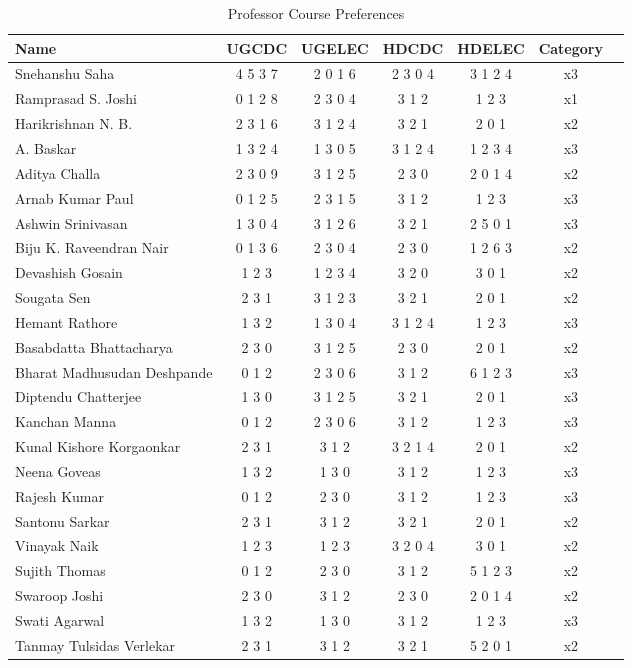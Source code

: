 \documentclass{article}
\begin{document}
\begin{table}[h]
  \centering
  \caption{Professor Course Preferences}
  \begin{tabular}{lcccccc}
    \toprule
    Name & UGCDC & UGELEC & HDCDC & HDELEC & Category \\
    \midrule
       Snehanshu Saha & 4 5 3 7 & 2 0 1 6 & 2 3 0 4 & 3 1 2 4 & x3 \\
Ramprasad S. Joshi & 0 1 2 8 & 2 3 0 4 & 3 1 2 & 1 2 3 & x1 \\
Harikrishnan N. B. & 2 3 1 6 & 3 1 2 4 & 3 2 1 & 2 0 1 & x2 \\
A. Baskar & 1 3 2 4 & 1 3 0 5 & 3 1 2 4 & 1 2 3 4 & x3 \\
Aditya Challa & 2 3 0 9 & 3 1 2 5 & 2 3 0 & 2 0 1 4 & x2 \\
Arnab Kumar Paul & 0 1 2 5 & 2 3 1 5 & 3 1 2 & 1 2 3 & x3 \\
Ashwin Srinivasan & 1 3 0 4 & 3 1 2 6 & 3 2 1 & 2 5 0 1 & x3 \\
Biju K. Raveendran Nair & 0 1 3 6 & 2 3 0 4 & 2 3 0 & 1 2 6 3 & x2 \\
Devashish Gosain & 1 2 3 & 1 2 3 4 & 3 2 0 & 3 0 1 & x2 \\
Sougata Sen & 2 3 1 & 3 1 2 3 & 3 2 1 & 2 0 1 & x2 \\
Hemant Rathore & 1 3 2 & 1 3 0 4 & 3 1 2 4 & 1 2 3 & x3 \\
Basabdatta Bhattacharya & 2 3 0 & 3 1 2 5 & 2 3 0 & 2 0 1 & x2 \\
Bharat Madhusudan Deshpande & 0 1 2 & 2 3 0 6 & 3 1 2 & 6 1 2 3 & x3 \\
Diptendu Chatterjee & 1 3 0 & 3 1 2 5 & 3 2 1 & 2 0 1 & x3 \\
Kanchan Manna & 0 1 2 & 2 3 0 6 & 3 1 2 & 1 2 3 & x3 \\
Kunal Kishore Korgaonkar & 2 3 1 & 3 1 2 & 3 2 1 4 & 2 0 1 & x2 \\
Neena Goveas & 1 3 2 & 1 3 0 & 3 1 2 & 1 2 3 & x3 \\
Rajesh Kumar & 0 1 2 & 2 3 0 & 3 1 2 & 1 2 3 & x3 \\
Santonu Sarkar & 2 3 1 & 3 1 2 & 3 2 1 & 2 0 1 & x2 \\
Vinayak Naik & 1 2 3 & 1 2 3 & 3 2 0 4 & 3 0 1 & x2 \\
Sujith Thomas & 0 1 2 & 2 3 0 & 3 1 2 & 5 1 2 3 & x2 \\
Swaroop Joshi & 2 3 0 & 3 1 2 & 2 3 0 & 2 0 1 4 & x2 \\
Swati Agarwal & 1 3 2 & 1 3 0 & 3 1 2 & 1 2 3 & x3 \\
Tanmay Tulsidas Verlekar & 2 3 1 & 3 1 2 & 3 2 1 & 5 2 0 1 & x2 \\

    \bottomrule
  \end{tabular}
  \label{tab:prof_preferences}
\end{table}
\end{document}
